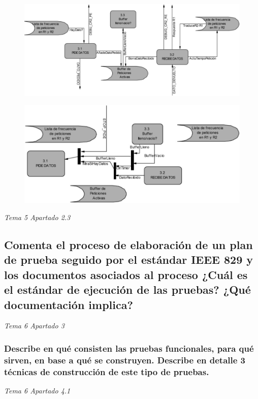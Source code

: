 \begin{figure}[H]
  \centering
  \includegraphics[width=0.8\linewidth]{Resources/diagramaA}
\end{figure}

\begin{figure}[H]
  \centering
  \includegraphics[width=0.8\linewidth]{Resources/diagramaB}
\end{figure}

\textit{Tema 5 Apartado 2.3}




\subsection{Comenta el proceso de elaboración de un plan de prueba seguido por el estándar IEEE 829 y los documentos asociados al proceso ¿Cuál es el estándar de ejecución de las pruebas? ¿Qué documentación implica?}
\textit{Tema 6 Apartado 3}

\subsubsection{Describe en qué consisten las pruebas funcionales, para qué sirven, en base a qué se construyen. Describe en detalle 3 técnicas de construcción de este tipo de pruebas.}
\textit{Tema 6 Apartado 4.1}

